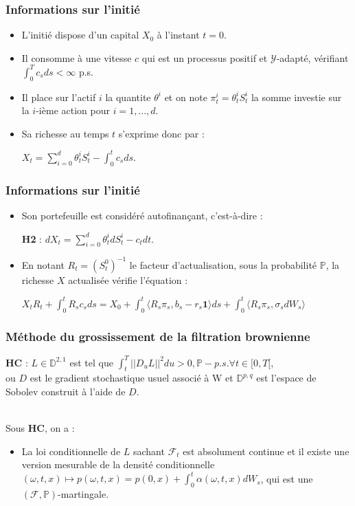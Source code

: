 \documentclass[french]{beamer}
\begin{document}
\begin{frame}
\frametitle{Informations sur l'initié}
\begin{itemize}
\item L'initié dispose d'un capital $X_0$ à l'instant $t=0$.
\item Il consomme à une vitesse $c$ qui est un processus positif et $\mathcal{Y}$-adapté, vérifiant $\int_{0}^{T} c_sds < \infty$ p.s. 
\item Il place sur l'actif $i$ la quantite $\theta^i$ et on note $\pi^i_t = \theta^i_t S^i_t$ la somme investie sur la $i$-ième action pour $i = 1,...,d$.
\item Sa richesse au temps $t$ s'exprime donc par :
\begin{center}
$X_t = \sum_{i=0}^{d} \theta^i_t S^i_t - \int_{0}^{t} c_s ds$.
\end{center}
\end{itemize}
\end{frame}

\begin{frame}
\frametitle{Informations sur l'initié}
\begin{itemize}
\item Son portefeuille est considéré autofinançant, c'est-à-dire : 
\begin{center}
\textbf{H2} : $dX_t = \sum_{i=0}^{d}\theta^i_t dS^i_t - c_t dt$.
\end{center}
\item En notant $R_t = (S^0_t)^{-1}$ le facteur d'actualisation, sous la probabilité $\mathbb{P}$, la richesse $X$ actualisée vérifie l'équation : 
\begin{center}
$X_t R_t + \int_{0}^{t} R_s c_s ds = X_0 +  \int_{0}^{t} \langle R_s\pi_s, b_s - r_s \textbf{1} \rangle ds + \int_{0}^{t} \langle R_s \pi_s, \sigma_s dW_s \rangle$
\end{center}
\end{itemize}
\end{frame}

\begin{frame}
\frametitle{Méthode du grossissement de la filtration brownienne}
\textbf{HC} : $L \in \mathbb{D}^{2,1}$ est tel que $\int_{t}^{T} ||D_u L||^2 du >0, \mathbb{P}-p.s. \forall t \in [0,T[$,\\
ou $D$ est le gradient stochastique usuel associé à W et $\mathbb{D}^{p,q}$ est l'espace de Sobolev construit à l'aide de $D$.\\
\

Sous \textbf{HC}, on a : 
\begin{itemize}
\item La loi conditionnelle de $L$ sachant $\mathcal{F}_t$ est absolument continue et il existe une version mesurable de la densité conditionnelle $(\omega, t, x) \longmapsto p(\omega, t, x) = p(0,x) + \int_{0}^{t} \alpha(\omega, t, x)dW_s$, qui est une $(\mathcal{F}, \mathbb{P})$-martingale.
\end{itemize}
\end{frame}
\end{document}
